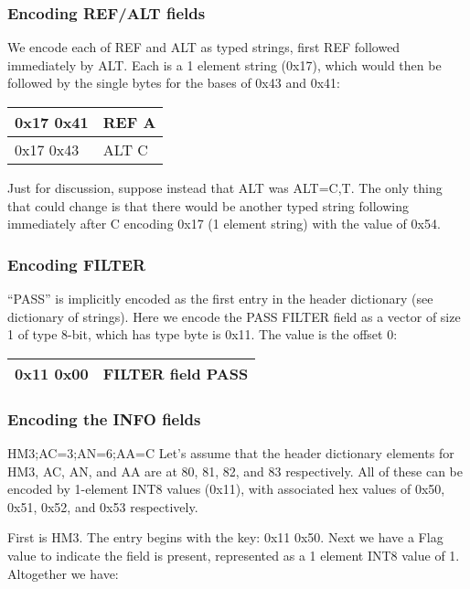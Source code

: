 \documentclass[8pt]{article}
\begin{document}
\subsubsection{Encoding REF/ALT fields}

We encode each of REF and ALT as typed strings, first REF followed immediately
by ALT.  Each is a 1 element string (0x17), which would then be followed by the
single bytes for the bases of 0x43 and 0x41:

\vspace{0.3cm}
\begin{tabular}{|l| l|} \hline
0x17 0x41 & REF A \\ \hline
0x17 0x43 & ALT C \\ \hline
\end{tabular}

\vspace{0.3cm}
Just for discussion, suppose instead that ALT was ALT=C,T.  The only thing that could change is that there would be another typed string following immediately after C encoding 0x17 (1 element string) with the value of 0x54.

\subsubsection{Encoding FILTER}

``PASS'' is implicitly encoded as the first entry in the header dictionary (see dictionary of strings).  Here we encode the PASS FILTER field as a vector of size 1 of type 8-bit, which has type byte is 0x11.  The value is the offset 0:

\vspace{0.3cm}
\begin{tabular}{|l| l|} \hline
0x11 0x00 & FILTER field PASS \\ \hline
\end{tabular}

\subsubsection{Encoding the INFO fields}

HM3;AC=3;AN=6;AA=C
Let's assume that the header dictionary elements for HM3, AC, AN, and AA are at 80, 81, 82, and 83 respectively.  All of these can be encoded by 1-element INT8 values (0x11), with associated hex values of 0x50, 0x51, 0x52, and 0x53 respectively.

First is HM3.  The entry begins with the key: 0x11 0x50.  Next we have a Flag value to indicate the field is present, represented as a 1 element INT8 value of 1.  Altogether we have:
\end{document}
